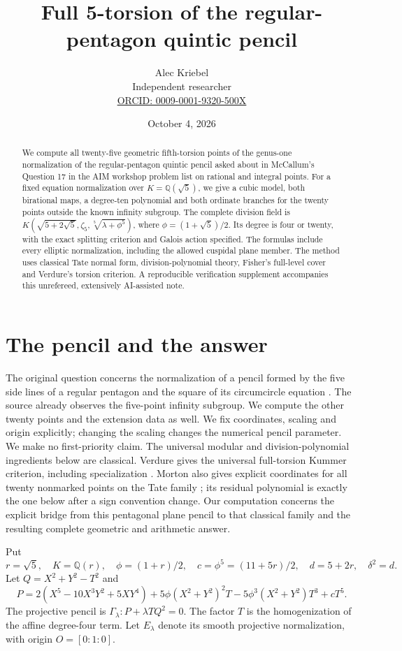 \documentclass[11pt]{article}
\title{Full 5-torsion of the regular-pentagon quintic pencil}
\author{Alec Kriebel\\\small Independent researcher\\
\small\href{https://orcid.org/0009-0001-9320-500X}{ORCID: 0009-0001-9320-500X}}
\date{October 4, 2026}
\newcommand{\Q}{\mathbb Q}
\begin{document}
\maketitle
\begin{abstract}
We compute all twenty-five geometric fifth-torsion points of the genus-one
normalization of the regular-pentagon quintic pencil asked about in
McCallum's Question 17 in the AIM workshop problem list on rational and
integral points. For a fixed equation normalization over $K=\Q(\sqrt5)$,
we give a cubic model, both birational maps, a degree-ten polynomial and
both ordinate branches for the twenty points outside the known infinity
subgroup. The complete division field is
$K(\sqrt{5+2\sqrt5},\zeta_5,\sqrt[5]{\lambda+\phi^5})$,
where $\phi=(1+\sqrt5)/2$. Its degree is four or twenty, with the exact
splitting criterion and Galois action specified. The formulas include
every elliptic normalization, including the allowed cuspidal plane
member. The method uses classical Tate normal form, division-polynomial
theory, Fisher's full-level cover and Verdure's torsion criterion. A reproducible verification
supplement accompanies this unrefereed, extensively AI-assisted note.
\end{abstract}

\section{The pencil and the answer}
The original question concerns the normalization of a pencil formed by
the five side lines of a regular pentagon and the square of its
circumcircle equation \cite[Question 17, p.~51]{aim}. The source already
observes the five-point infinity subgroup. We compute the other twenty
points and the extension data as well. We fix coordinates, scaling and
origin explicitly; changing the scaling changes the numerical pencil
parameter. We make no first-priority claim. The universal modular and
division-polynomial ingredients below are classical. Verdure gives the
universal full-torsion Kummer criterion, including specialization
\cite[Theorem 5, pp.~84--88]{verdure}. Morton also gives
explicit coordinates for all twenty nonmarked points on the Tate family
\cite[Theorem 2.1]{morton}; its residual polynomial is exactly the one
below after a sign convention change. Our computation concerns the
explicit bridge from this pentagonal plane pencil to that classical
family and the resulting complete geometric and arithmetic answer.

Put
\[
r=\sqrt5,\quad K=\Q(r),\quad \phi=(1+r)/2,\quad
c=\phi^5=(11+5r)/2,\quad d=5+2r,\quad \delta^2=d.
\]
Let $Q=X^2+Y^2-T^2$ and
\begin{equation}\label{pentagon}
P=2(X^5-10X^3Y^2+5XY^4)+5\phi(X^2+Y^2)^2T
 -5\phi^3(X^2+Y^2)T^3+cT^5.
\end{equation}
The projective pencil is $\Gamma_\lambda:P+\lambda TQ^2=0$.
The factor $T$ is the homogenization of the affine degree-four term.
Let $E_\lambda$ denote its smooth projective normalization, with origin
$O=[0:1:0]$.
\end{document}

